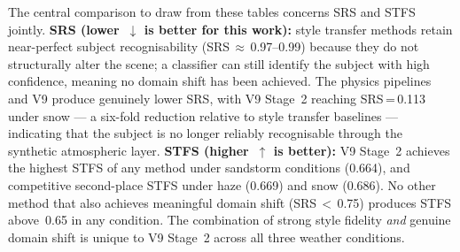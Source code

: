 \noindent The central comparison to draw from these tables concerns SRS and STFS jointly. \textbf{SRS (lower~$\downarrow$ is better for this work):} style transfer methods retain near-perfect subject recognisability (SRS\,$\approx$\,0.97--0.99) because they do not structurally alter the scene; a classifier can still identify the subject with high confidence, meaning no domain shift has been achieved. The physics pipelines and V9 produce genuinely lower SRS, with V9 Stage~2 reaching SRS\,=\,0.113 under snow --- a six-fold reduction relative to style transfer baselines --- indicating that the subject is no longer reliably recognisable through the synthetic atmospheric layer. \textbf{STFS (higher~$\uparrow$ is better):} V9 Stage~2 achieves the highest STFS of any method under sandstorm conditions (0.664), and competitive second-place STFS under haze (0.669) and snow (0.686). No other method that also achieves meaningful domain shift (SRS\,$<$\,0.75) produces STFS above~0.65 in any condition. The combination of strong style fidelity \emph{and} genuine domain shift is unique to V9 Stage~2 across all three weather conditions.



